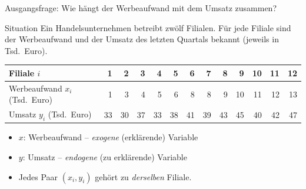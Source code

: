 \documentclass[aspectratio=169,11pt]{beamer}
\begin{document}
\begin{frame}{Ausgangsfrage: Wie hängt der Werbeaufwand mit dem Umsatz zusammen?}
  \begin{block}{Situation}
    Ein Handelsunternehmen betreibt zwölf Filialen. Für jede Filiale sind der
    Werbeaufwand und der Umsatz des letzten Quartals bekannt (jeweils in Tsd.\ Euro).
  \end{block}

  \medskip

  \begin{center}
    \renewcommand{\arraystretch}{1.1}
    \begin{tabular}{l*{12}{r}}
      \toprule
      Filiale $i$                   & 1  & 2  & 3  & 4  & 5  & 6  & 7  & 8  & 9  & 10 & 11 & 12 \\
      \midrule
      Werbeaufwand $x_i$ (Tsd.\ Euro) & 1  & 3  & 4  & 5  & 6  & 8  & 8  & 9  & 10 & 11 & 12 & 13 \\
      Umsatz $y_i$ (Tsd.\ Euro)       & 33 & 30 & 37 & 33 & 38 & 41 & 39 & 43 & 45 & 40 & 42 & 47 \\
      \bottomrule
    \end{tabular}
  \end{center}

  \medskip

  \begin{itemize}
    \item $x$: Werbeaufwand -- \emph{exogene} (erklärende) Variable
    \item $y$: Umsatz -- \emph{endogene} (zu erklärende) Variable
    \item Jedes Paar $(x_i, y_i)$ gehört zu \emph{derselben} Filiale.
  \end{itemize}
\end{frame}
\end{document}
